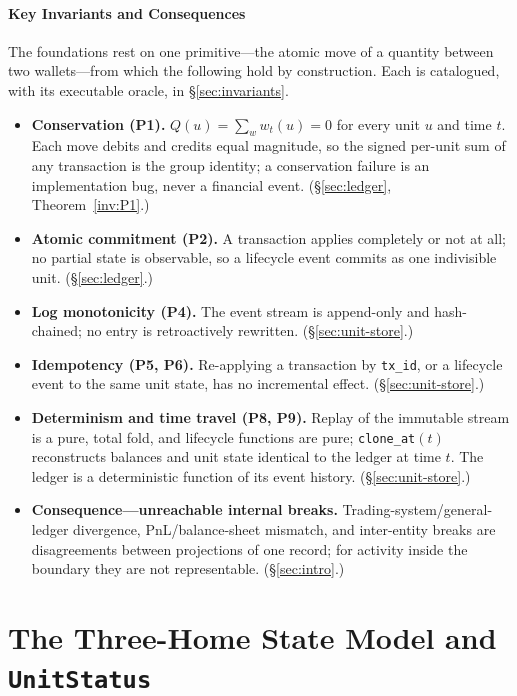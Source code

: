 \documentclass[11pt,a4paper]{article}
\begin{document}
\subsection*{Key Invariants and Consequences}

The foundations rest on one primitive---the atomic move of a quantity between two
wallets---from which the following hold by construction. Each is catalogued, with its
executable oracle, in \S\ref{sec:invariants}.

\begin{itemize}[nosep]
\item \textbf{Conservation (P1).} $Q(u)=\sum_w w_t(u)=0$ for every unit $u$ and time $t$.
Each move debits and credits equal magnitude, so the signed per-unit sum of any
transaction is the group identity; a conservation failure is an implementation bug, never
a financial event. (\S\ref{sec:ledger}, Theorem~\ref{inv:P1}.)
\item \textbf{Atomic commitment (P2).} A transaction applies completely or not at all; no
partial state is observable, so a lifecycle event commits as one indivisible unit.
(\S\ref{sec:ledger}.)
\item \textbf{Log monotonicity (P4).} The event stream is append-only and hash-chained; no
entry is retroactively rewritten. (\S\ref{sec:unit-store}.)
\item \textbf{Idempotency (P5, P6).} Re-applying a transaction by \texttt{tx\_id}, or a
lifecycle event to the same unit state, has no incremental effect.
(\S\ref{sec:unit-store}.)
\item \textbf{Determinism and time travel (P8, P9).} Replay of the immutable stream is a
pure, total fold, and lifecycle functions are pure; \texttt{clone\_at}$(t)$ reconstructs
balances and unit state identical to the ledger at time $t$. The ledger is a deterministic
function of its event history. (\S\ref{sec:unit-store}.)
\item \textbf{Consequence---unreachable internal breaks.} Trading-system/general-ledger
divergence, PnL/balance-sheet mismatch, and inter-entity breaks are disagreements between
projections of one record; for activity inside the boundary they are not representable.
(\S\ref{sec:intro}.)
\end{itemize}


\part{The Three-Home State Model and \texorpdfstring{\texttt{UnitStatus}}{UnitStatus}}
\end{document}
